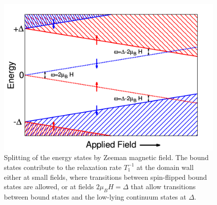 \documentclass[prb,aps,showpacs,amsmath,twocolumn,10pt]{revtex4-1}
\begin{document}
\begin{figure}
\includegraphics[scale=0.25]{./Fig5} 
\caption{\label{fig:rel_trans}
Splitting of the energy states by Zeeman magnetic field. The bound states contribute to the relaxation rate 
$T_1^{-1}$ at the domain wall either at small fields, where transitions between spin-flipped bound states are allowed, 
or at fields $2\mu_B H = \Delta$ that allow transitions between bound states and the low-lying continuum 
states at $\Delta$. 
}
\end{figure}

\end{document}
